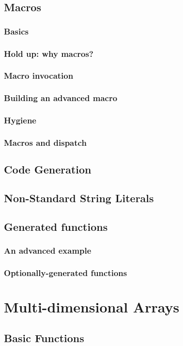     \section{Macros}
    \subsection{Basics}
    \subsection{Hold up: why macros?}
    \subsection{Macro invocation}
    \subsection{Building an advanced macro}
    \subsection{Hygiene}
    \subsection{Macros and dispatch}
    \section{Code Generation}
    \section{Non-Standard String Literals}
    \section{Generated functions}
    \subsection{An advanced example}
    \subsection{Optionally-generated functions}
  \chapter{Multi-dimensional Arrays}
    \section{Basic Functions}
